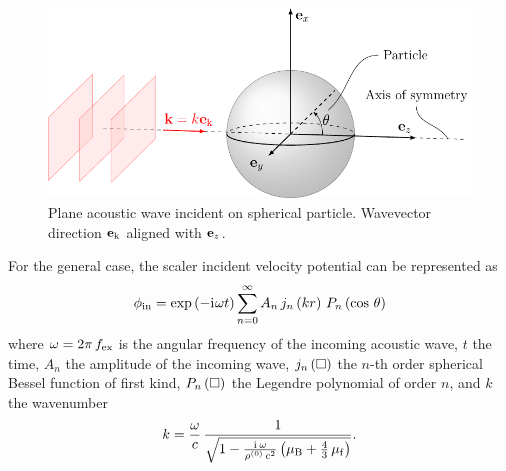\begin{figure}[tbp]
  \centering
  \includegraphics[]{External/plane_wave.pdf}
  \caption{Plane acoustic wave incident on spherical particle. Wavevector 
  direction $\vb{e}_{\mathrm{k}}$ aligned with $\vb{e}_{z}$.}
  \label{fig:TA-plane_wave}
\end{figure}

For the general case, the scaler incident velocity potential can be represented 
as
\begin{equation}
  \phi_{\mathrm{in}} = \exp\left( -\mathrm{i}\mkern1mu\omega t \right) \sum\limits_{n=0}^{\infty} 
  A_{n}\,j_{n}\left(kr\right)\,P_{n}\left(\cos\,\theta\right)
  \label{eq:TA-incident-field}
\end{equation}
where $\omega=2\pi\,f_{\mathrm{ex}}$ is the angular frequency of the incoming acoustic 
wave, $t$ the time, $A_{n}$ the amplitude of the incoming wave, 
$j_{n}\left(\Box\right)$ the $n$-th order spherical Bessel function of first kind, 
$P_{n}\left(\Box\right)$ the Legendre polynomial of order $n$, and $k$ the 
wavenumber
\begin{equation}
  k = 
  \frac{\omega}{c}\,\frac{1}{\sqrt{1-\frac{\mathrm{i}\mkern1mu\,\omega}{\rho^{(0)}\,c^{2}} 
  \left( \mu_{\mathrm{B}} + \frac{4}{3}\,\mu_{\mathrm{f}} \right)}}.
  \label{eq:TA-wavenumber}
\end{equation}

